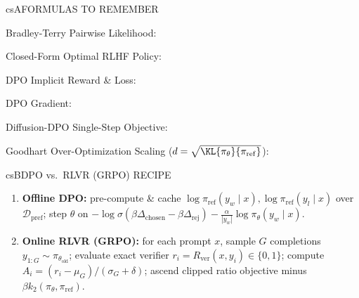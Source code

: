 \documentclass[../../../../master.tex]{subfiles}
\begin{document}

\csnextpage

\begin{cscolumns}
\begin{cscard}{csA}{FORMULAS TO REMEMBER}
  \begin{csbul}
    \item Bradley-Terry Pairwise Likelihood:
    \item Closed-Form Optimal RLHF Policy:
    \item DPO Implicit Reward \& Loss:
    \item DPO Gradient:
    \item Diffusion-DPO Single-Step Objective:
    \item Goodhart Over-Optimization Scaling ($d=\sqrt{\KL{\pi_\theta}{\pi_{\mathrm{ref}}}}$):
  \end{csbul}
\end{cscard}

\begin{cscard}{csB}{DPO vs.\ RLVR (GRPO) RECIPE}
  \begin{enumerate}[leftmargin=1.2em, itemsep=1pt, topsep=1pt, parsep=0pt]
    \item \textbf{Offline DPO:} pre-compute \& cache $\log\pi_{\mathrm{ref}}(y_w\mid x),\log\pi_{\mathrm{ref}}(y_l\mid x)$ over $\mathcal{D}_{\mathrm{pref}}$; step $\theta$ on $-\log\sigma(\beta\Delta_{\mathrm{chosen}}-\beta\Delta_{\mathrm{rej}}) - \frac{\alpha}{|y_w|}\log\pi_\theta(y_w\mid x)$.
    \item \textbf{Online RLVR (GRPO):} for each prompt $x$, sample $G$ completions $y_{1:G}\sim\pi_{\theta_{\mathrm{old}}}$; evaluate exact verifier $r_i=R_{\mathrm{ver}}(x,y_i)\in\{0,1\}$; compute $A_i=(r_i-\mu_G)/(\sigma_G+\delta)$; ascend clipped ratio objective minus $\beta k_2(\pi_\theta,\pi_{\mathrm{ref}})$.
  \end{enumerate}
\end{cscard}
\columnbreak


\end{cscolumns}
\end{document}
